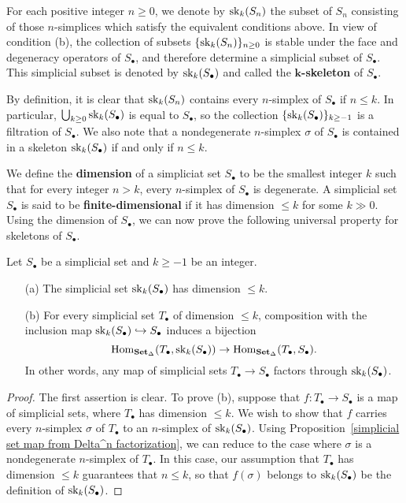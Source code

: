 For each positive integer $n\geq 0$, we denote by $\mathrm{sk}_k(S_n)$ the subset of $S_n$ consisting of those $n$-simplices which satisfy the equivalent conditions above. In view of condition (b), the collection of subsets $\{\mathrm{sk}_k(S_n)\}_{n\geq 0}$ is stable under the face and degeneracy operators of $S_\bullet$, and therefore determine a simplicial subset of $S_\bullet$. This simplicial subset is denoted by $\mathrm{sk}_k(S_\bullet)$ and called the \textbf{$\bm{k}$-skeleton} of $S_\bullet$.\par
By definition, it is clear that $\mathrm{sk}_k(S_n)$ contains every $n$-simplex of $S_\bullet$ if $n\leq k$. In particular, $\bigcup_{k\geq 0}\mathrm{sk}_k(S_\bullet)$ is equal to $S_\bullet$, so the collection $\{\mathrm{sk}_k(S_\bullet)\}_{k\geq-1}$ is a filtration of $S_\bullet$. We also note that a nondegenerate $n$-simplex $\sigma$ of $S_\bullet$ is contained in a skeleton $\mathrm{sk}_k(S_\bullet)$ if and only if $n\leq k$.\par
We define the \textbf{dimension} of a simpliciat set $S_\bullet$ to be the smallest integer $k$ such that for every integer $n>k$, every $n$-simplex of $S_\bullet$ is degenerate. A simplicial set $S_\bullet$ is said to be \textbf{finite-dimensional} if it has dimension $\leq k$ for some $k\gg 0$. Using the dimension of $S_\bullet$, we can now prove the following universal property for skeletons of $S_\bullet$.
\begin{proposition}\label{simplicial set skeleton universal prop}
Let $S_\bullet$ be a simplicial set and $k\geq -1$ be an integer.
\begin{itemize}
\item[(a)] The simplicial set $\mathrm{sk}_k(S_\bullet)$ has dimension $\leq k$.
\item[(b)] For every simplicial set $T_\bullet$ of dimension $\leq k$, composition with the inclusion map $\mathrm{sk}_k(S_\bullet)\hookrightarrow S_\bullet$ induces a bijection
\[\mathrm{Hom}_{\mathbf{Set}_\Delta}(T_\bullet,\mathrm{sk}_k(S_\bullet))\to\mathrm{Hom}_{\mathbf{Set}_\Delta}(T_\bullet,S_\bullet).\]
In other words, any map of simplicial sets $T_\bullet\to S_\bullet$ factors through $\mathrm{sk}_k(S_\bullet)$.
\end{itemize}
\end{proposition}
\begin{proof}
The first assertion is clear. To prove (b), suppose that $f:T_\bullet\to S_\bullet$ is a map of simplicial sets, where $T_\bullet$ has dimension $\leq k$. We wish to show that $f$ carries every $n$-simplex $\sigma$ of $T_\bullet$ to an $n$-simplex of $\mathrm{sk}_k(S_\bullet)$. Using Proposition~\ref{simplicial set map from Delta^n factorization}, we can reduce to the case where $\sigma$ is a nondegenerate $n$-simplex of $T_\bullet$. In this case, our assumption that $T_\bullet$ has dimension $\leq k$ guarantees that $n\leq k$, so that $f(\sigma)$ belongs to $\mathrm{sk}_k(S_\bullet)$ be the definition of $\mathrm{sk}_k(S_\bullet)$.
\end{proof}
